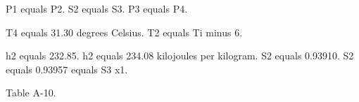 P1 equals P2.  
S2 equals S3.  
P3 equals P4.  

T4 equals 31.30 degrees Celsius.  
T2 equals Ti minus 6.  

h2 equals 232.85.  
h2 equals 234.08 kilojoules per kilogram.  
S2 equals 0.93910.  
S2 equals 0.93957 equals S3 x1.  

Table A-10.